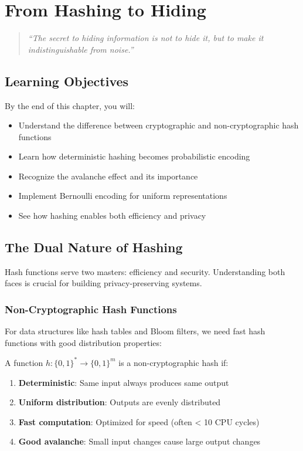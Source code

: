 \chapter{From Hashing to Hiding}
\label{ch:hashing}

\begin{quote}
\textit{``The secret to hiding information is not to hide it, but to make it indistinguishable from noise.''}
\end{quote}

\section*{Learning Objectives}
By the end of this chapter, you will:
\begin{itemize}
\item Understand the difference between cryptographic and non-cryptographic hash functions
\item Learn how deterministic hashing becomes probabilistic encoding
\item Recognize the avalanche effect and its importance
\item Implement Bernoulli encoding for uniform representations
\item See how hashing enables both efficiency and privacy
\end{itemize}

\section{The Dual Nature of Hashing}

Hash functions serve two masters: efficiency and security. Understanding both faces is crucial for building privacy-preserving systems.

\subsection{Non-Cryptographic Hash Functions}

For data structures like hash tables and Bloom filters, we need fast hash functions with good distribution properties:

\begin{definition}
A function $h: \{0,1\}^* \to \{0,1\}^m$ is a non-cryptographic hash if:
\begin{enumerate}
\item \textbf{Deterministic}: Same input always produces same output
\item \textbf{Uniform distribution}: Outputs are evenly distributed
\item \textbf{Fast computation}: Optimized for speed (often < 10 CPU cycles)
\item \textbf{Good avalanche}: Small input changes cause large output changes
\end{enumerate}
\end{definition}

